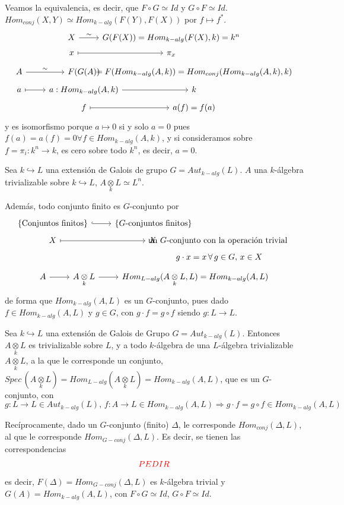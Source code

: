 \begin{dem}
    Veamos la equivalencia, es decir, que $F \circ G \simeq Id$ y $G \circ F \simeq Id$. $Hom_{conj}(X,Y) \simeq Hom_{k-alg}(F(Y), F(X))$ por $f\longmapsto f^*$. 
    $$\bt X \rar{\sim} &  G(F(X)) = Hom_{k-alg}(F(X),k) = k^n \\[-5mm] x \rarmaps & \pi_x \et$$ 
    $$\bt A \rar{\sim} & F(G(A)) &[-21mm] = F(Hom_{k-alg}(A,k)) = Hom_{conj}(Hom_{k-alg}(A,k), k) \\[-5mm]  a\rarmaps & a: Hom_{k-alg}(A,k) \rar & k \\[-5mm] & f \rarmaps & a(f) = f(a) \et$$
    y es isomorfismo porque $a \longmapsto 0$ si y solo $a=0$ pues $f(a) = a(f) = 0 \forall f \in Hom_{k-alg}(A,k)$, y si consideramos sobre $f = \pi_i: k^n \to k$, es cero sobre todo $k^n$, es decir, $a = 0$. 
\end{dem}

Sea $k \hookrightarrow L$ una extensi\'on de Galois de grupo $G = Aut_{k-alg} (L)$. $A$ una $k$-\'algebra trivializable sobre $ k \hookrightarrow L$, $A \underset{k}{\otimes}L \simeq L^n$.

Adem\'as, todo conjunto finito es $G$-conjunto por 
$$\bt \{\text{Conjuntos finitos}\} \rar[hook] & \{G\text{-conjuntos finitos}\} \\[-5mm] X \rarmaps & X \,&[-30mm]\text{un } G\text{-conjunto con la operaci\'on trivial } \\[-5mm] && g\cdot x = x \, \forall \, g\in G, \, x\in X \et$$
$$\bt A \rar & A\underset{k}{\otimes}L \rar & Hom_{L-alg}(A\underset{k}{\otimes} L, L ) = Hom_{k-alg}(A,L)\et$$
de forma que $Hom_{k-alg}(A,L)$ es un $G$-conjunto, pues dado $f \in Hom_{k-alg}(A,L)$ y $g\in G$, con $g\cdot f = g\circ f$ siendo $g : L \longrightarrow L$.

Sea $k \hookrightarrow L$ una extensi\'on de Galois de Grupo $G = Aut_{k-alg}(L)$. Entonces $A \underset{k}{\otimes} L$ es trivializable sobre $L$, y a todo $k$-\'algebra de una $L$-\'algebra trivializable $A\underset{k}{\otimes} L$, a la que le corresponde un conjunto, $Spec\, (A \underset{k}{\otimes} L) = Hom_{L-alg}(A\underset{k}{\otimes} L) = Hom_{k-alg}(A, L)$, que es un $G$-conjunto, con
$$g : L \to L \in Aut_{k-alg}(L) , \, f : A \to L \in Hom_{k-alg}(A,L) \Rightarrow g\cdot f = g\circ f \in Hom_{k-alg}(A,L)$$

Rec\'iprocamente, dado un $G$-conjunto (finito) $\Delta$, le corresponde $Hom_{conj}(\Delta, L)$, al que le corresponde $Hom_{G-conj}(\Delta, L)$. Es decir, se tienen las correspondencias
$$\textcolor{red}{PEDIR}$$
es decir, $F(\Delta) = Hom_{G-conj}(\Delta, L)$ es $k$-\'algebra trivial y $G(A) = Hom_{k-alg}(A,L)$, con $F\circ G \simeq Id$, $G\circ F \simeq Id$. 


